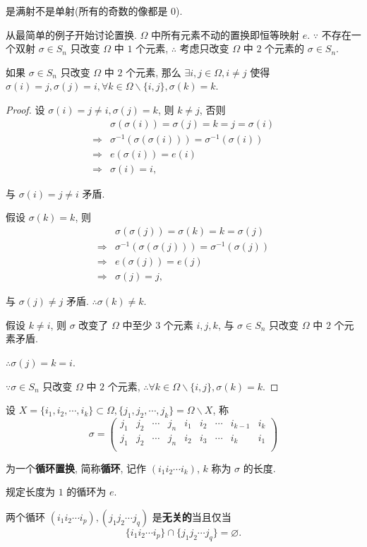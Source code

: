 \documentclass[color=black,device=normal,lang=cn,mode=geye]{elegantnote}
\begin{document}
是满射不是单射(所有的奇数的像都是 $0$).

从最简单的例子开始讨论置换. $\Omega$ 中所有元素不动的置换即恒等映射 $e$. $\because$ 不存在一个双射 $\sigma\in S_n$ 只改变 $\Omega$ 中 $1$ 个元素, $\therefore$ 考虑只改变 $\Omega$ 中 $2$ 个元素的 $\sigma\in S_n$.
\begin{lemma}
    如果 $\sigma\in S_n$ 只改变 $\Omega$ 中 $2$ 个元素, 那么 $\exists i,j\in\Omega,i\neq j$ 使得 $\sigma(i)=j,\sigma(j)=i,\forall k\in\Omega\backslash\{i,j\},\sigma(k)=k$.
\end{lemma}
\begin{proof}
    设 $\sigma(i)=j\neq i,\sigma(j)=k$, 则 $k\neq j$, 否则
    \begin{align*}
        & \sigma(\sigma(i))=\sigma(j)=k=j=\sigma(i) \\
        \Rightarrow & \sigma^{-1}(\sigma(\sigma(i)))=\sigma^{-1}(\sigma(i)) \\
        \Rightarrow & e(\sigma(i))=e(i) \\
        \Rightarrow & \sigma(i)=i,
    \end{align*}

    与 $\sigma(i)=j\neq i$ 矛盾.

    假设 $\sigma(k)=k$, 则
    \begin{align*}
        & \sigma(\sigma(j))=\sigma(k)=k=\sigma(j) \\
        \Rightarrow & \sigma^{-1}(\sigma(\sigma(j)))=\sigma^{-1}(\sigma(j)) \\
        \Rightarrow & e(\sigma(j))=e(j) \\
        \Rightarrow & \sigma(j)=j,
    \end{align*}
    
    与 $\sigma(j)\neq j$ 矛盾. $\therefore\sigma(k)\neq k$.
    
    假设 $k\neq i$, 则 $\sigma$ 改变了 $\Omega$ 中至少 $3$ 个元素 $i,j,k$, 与 $\sigma\in S_n$ 只改变 $\Omega$ 中 $2$ 个元素矛盾.

    $\therefore\sigma(j)=k=i$.

    $\because\sigma\in S_n$ 只改变 $\Omega$ 中 $2$ 个元素, $\therefore\forall k\in\Omega\backslash\{i,j\},\sigma(k)=k.$
\end{proof}
\begin{definition}
    设 $X=\{i_1,i_2,\cdots,i_k\}\subset\Omega,\{j_1,j_2,\cdots,j_k\}=\Omega\backslash X$, 称
    \[\sigma=\begin{pmatrix}
        j_1 & j_2 & \cdots & j_n & i_1 & i_2 & \cdots & i_{k-1} & i_k \\
        j_1 & j_2 & \cdots & j_n & i_2 & i_3 & \cdots & i_k & i_1 \\
    \end{pmatrix}\]

    为一个\textbf{循环置换}, 简称\textbf{循环}, 记作 $(i_1i_2\cdots i_k)$, $k$ 称为 $\sigma$ 的长度.

    规定长度为 $1$ 的循环为 $e$.
\end{definition}
\begin{definition}
    两个循环 $(i_1i_2\cdots i_p),(j_1j_2\cdots j_q)$ 是\textbf{无关的}当且仅当
    \[\{i_1i_2\cdots i_p\}\cap\{j_1j_2\cdots j_q\}=\varnothing.\]
\end{definition}
\end{document}
